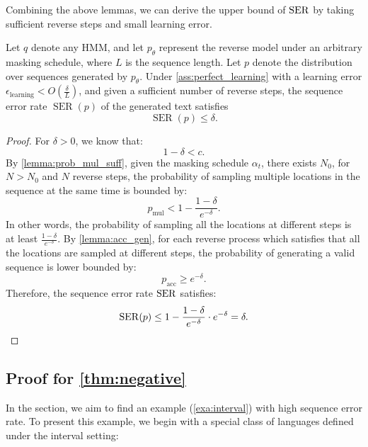 Combining the above lemmas, we can derive the upper bound of $\operatorname{SER}$ by taking sufficient reverse steps and small learning error.

\begin{theorem}
    Let $q$ denote any HMM, and let $p_\mathsf{\theta}$ represent the reverse model under an arbitrary masking schedule, where $L$ is the sequence length. Let $p$ denote the distribution over sequences generated by $p_\mathsf{\theta}$. Under \cref{ass:perfect_learning} with a learning error $\epsilon_\text{learning} < O(\frac{\delta}{L})$, and given a sufficient number of reverse steps, the sequence error rate $\operatorname{SER}(p)$ of the generated text satisfies 
    \[
    \operatorname{SER}(p) \leq  \delta.
    \]
\end{theorem}

\begin{proof}
    For $\delta>0$, we know that:
    $$1-\delta<c.$$
    By \cref{lemma:prob_mul_suff}, given the masking schedule $\alpha_t$, there exists $N_0$, for $N>N_0$ and $N$ reverse steps, the probability of sampling multiple locations in the sequence at the same time is bounded by:
    $$p_\mathrm{mul}<1-\frac{1-\delta}{e^{-\delta}}.$$
    In other words, the probability of sampling all the locations at different steps is at least $\frac{1-\delta}{e^{-\delta}}$. By \cref{lemma:acc_gen}, for each reverse process which satisfies that all the locations are sampled at different steps, the probability of generating a valid sequence is lower bounded by:
    $$p_\mathrm{acc}\geq e^{-\delta}.$$
    Therefore, the sequence error rate $\operatorname{SER}$ satisfies:
    $$\operatorname{SER}(p)\leq 1-\frac{1-\delta}{e^{-\delta}}\cdot e^{-\delta}= \delta.$$
\end{proof}

\subsection{Proof for \cref{thm:negative}}
\label{app:proof_neg}
In the section, we aim to find an example (\cref{exa:interval}) with high sequence error rate. To present this example, we begin with a special class of languages defined under the interval setting:

